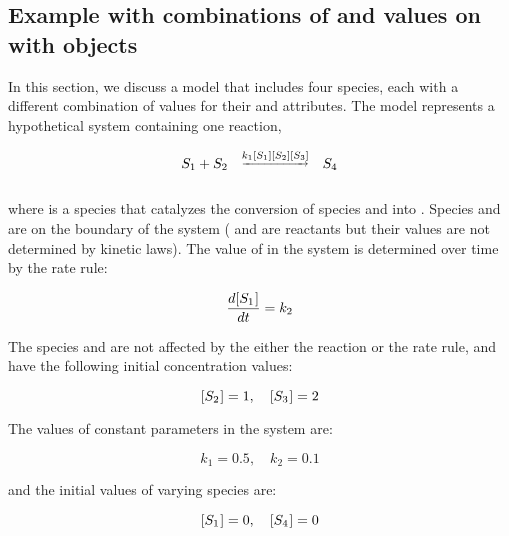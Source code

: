 

\subsection{Example with combinations of
   and  values on 
  with  objects}
\label{sec:constantspecieseg}

In this section, we discuss a model that includes four species,
each with a different combination of values for their
 and  attributes.  The
model represents a hypothetical system containing one reaction,
\begin{linenomath}
\begin{equation*}
  \begin{array}{@{}ccc@{}}
    S_1 + S_2 & \overset{\underrightarrow{k_1 [S_1] [S_2] [S_3]}}{} & S_4 \\ \\[-4pt]
  \end{array}
\end{equation*}
\end{linenomath}
where  is a species that catalyzes the conversion of
species  and  into .
Species  and  are on the boundary of the
system (\ie {} and  are reactants but
their values are not determined by kinetic laws).  The value of
 in the system is determined over time by the rate
rule:
\begin{linenomath}
  \begin{equation*}
    \dfrac{d [S_1\mkern1mu]}{d t} = k_2
  \end{equation*}
\end{linenomath}
The species  and  are not affected by
the either the reaction or the rate rule, and have the following
initial concentration values:
\begin{linenomath}
  \begin{equation*}
    [S_2\mkern1mu] = 1, \quad [S_3\mkern1mu] = 2
  \end{equation*}
\end{linenomath}
The values of constant parameters in the system are:
\begin{linenomath}
  \begin{equation*}
    k_1 = 0.5, \quad k_2 = 0.1
  \end{equation*}
\end{linenomath}
and the initial values of varying species are:
\begin{linenomath}
  \begin{equation*}
    [S_1\mkern1mu] = 0, \quad [S_4\mkern1mu] = 0
  \end{equation*}
\end{linenomath}

